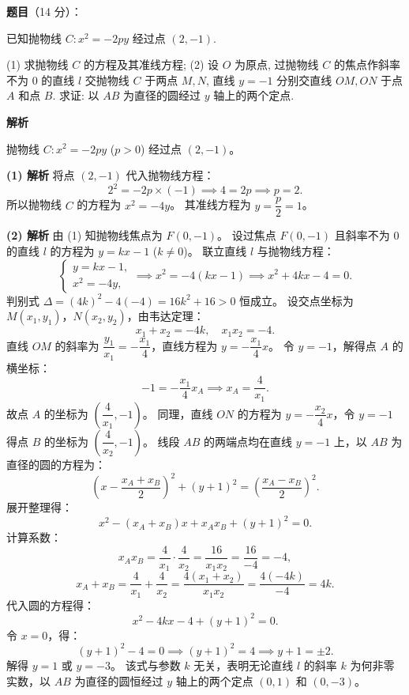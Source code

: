 \begin{answer}

\textbf{题目}（14 分）：

已知抛物线 $C: x^2 = -2py$ 经过点 $(2, -1)$.

(1) 求抛物线 $C$ 的方程及其准线方程;  
(2) 设 $O$ 为原点, 过抛物线 $C$ 的焦点作斜率不为 0 的直线 $l$ 交抛物线 $C$ 于两点 $M, N$, 直线 $y = -1$ 分别交直线 $OM, ON$ 于点 $A$ 和点 $B$. 求证: 以 $AB$ 为直径的圆经过 $y$ 轴上的两个定点.

\textbf{解析}

抛物线 $C: x^2 = -2py$ ($p > 0$) 经过点 $(2, -1)$。

\textbf{(1) 解析}
将点 $(2, -1)$ 代入抛物线方程：
\nopagebreak[4]
\[2^2 = -2p \times (-1) \implies 4 = 2p \implies p = 2.\]
所以抛物线 $C$ 的方程为 $x^2 = -4y$。
其准线方程为 $y = \dfrac{p}{2} = 1$。

\textbf{(2) 解析}
由 (1) 知抛物线焦点为 $F(0, -1)$。
设过焦点 $F(0, -1)$ 且斜率不为 0 的直线 $l$ 的方程为 $y = kx - 1$ ($k \neq 0$)。
联立直线 $l$ 与抛物线方程：
\nopagebreak[4]
\[\begin{cases} y = kx - 1, \\ x^2 = -4y, \end{cases} \implies x^2 = -4(kx - 1) \implies x^2 + 4kx - 4 = 0.\]
判别式 $\Delta = (4k)^2 - 4(-4) = 16k^2 + 16 > 0$ 恒成立。
设交点坐标为 $M(x_1, y_1)$，$N(x_2, y_2)$，由韦达定理：
\nopagebreak[4]
\[x_1 + x_2 = -4k, \quad x_1 x_2 = -4.\]
直线 $OM$ 的斜率为 $\dfrac{y_1}{x_1} = -\dfrac{x_1}{4}$，直线方程为 $y = -\dfrac{x_1}{4}x$。
令 $y = -1$，解得点 $A$ 的横坐标：
\nopagebreak[4]
\[-1 = -\frac{x_1}{4}x_A \implies x_A = \frac{4}{x_1}.\]
故点 $A$ 的坐标为 $\left(\dfrac{4}{x_1}, -1\right)$。
同理，直线 $ON$ 的方程为 $y = -\dfrac{x_2}{4}x$，令 $y = -1$ 得点 $B$ 的坐标为 $\left(\dfrac{4}{x_2}, -1\right)$。
线段 $AB$ 的两端点均在直线 $y = -1$ 上，以 $AB$ 为直径的圆的方程为：
\nopagebreak[4]
\[\left(x - \frac{x_A + x_B}{2}\right)^2 + (y + 1)^2 = \left(\frac{x_A - x_B}{2}\right)^2.\]
展开整理得：
\nopagebreak[4]
\[x^2 - (x_A + x_B)x + x_A x_B + (y + 1)^2 = 0.\]
计算系数：
\nopagebreak[4]
\[x_A x_B = \frac{4}{x_1} \cdot \frac{4}{x_2} = \frac{16}{x_1 x_2} = \frac{16}{-4} = -4,\]
\nopagebreak[4]
\[x_A + x_B = \frac{4}{x_1} + \frac{4}{x_2} = \frac{4(x_1 + x_2)}{x_1 x_2} = \frac{4(-4k)}{-4} = 4k.\]
代入圆的方程得：
\nopagebreak[4]
\[x^2 - 4kx - 4 + (y + 1)^2 = 0.\]
令 $x = 0$，得：
\nopagebreak[4]
\[(y + 1)^2 - 4 = 0 \implies (y + 1)^2 = 4 \implies y + 1 = \pm 2.\]
解得 $y = 1$ 或 $y = -3$。
该式与参数 $k$ 无关，表明无论直线 $l$ 的斜率 $k$ 为何非零实数，以 $AB$ 为直径的圆恒经过 $y$ 轴上的两个定点 $(0, 1)$ 和 $(0, -3)$。



\end{answer}
